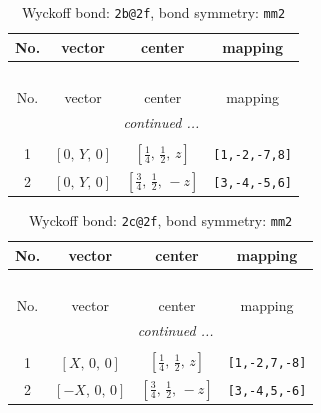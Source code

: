 \documentclass[fleqn,8pt]{jsarticle}
\begin{document}
\renewcommand{\arraystretch}{1.2}
\begin{longtable}{cccc}
\caption{Wyckoff bond: {\tt 2b@2f}, bond symmetry: {\tt mm2}}
 \\
 \hline \hline
No. & vector & center & mapping \\ \hline \endfirsthead

\multicolumn{3}{l}{\tablename\ \thetable{}} \\
 \hline \hline
No. & vector & center & mapping \\ \hline \endhead

 \hline \hline
\multicolumn{3}{r}{\footnotesize\it continued ...} \\ \endfoot

 \hline \hline
\multicolumn{3}{r}{} \\ \endlastfoot

1 & $\left[ 0,\, Y,\, 0 \right]$ & $\left[ \frac{1}{4},\, \frac{1}{2},\, z \right]$ & {\tt [1,-2,-7,8]} \\ \hline
2 & $\left[ 0,\, Y,\, 0 \right]$ & $\left[ \frac{3}{4},\, \frac{1}{2},\, - z \right]$ & {\tt [3,-4,-5,6]} \\
\end{longtable}
\renewcommand{\arraystretch}{1.2}
\begin{longtable}{cccc}
\caption{Wyckoff bond: {\tt 2c@2f}, bond symmetry: {\tt mm2}}
 \\
 \hline \hline
No. & vector & center & mapping \\ \hline \endfirsthead

\multicolumn{3}{l}{\tablename\ \thetable{}} \\
 \hline \hline
No. & vector & center & mapping \\ \hline \endhead

 \hline \hline
\multicolumn{3}{r}{\footnotesize\it continued ...} \\ \endfoot

 \hline \hline
\multicolumn{3}{r}{} \\ \endlastfoot

1 & $\left[ X,\, 0,\, 0 \right]$ & $\left[ \frac{1}{4},\, \frac{1}{2},\, z \right]$ & {\tt [1,-2,7,-8]} \\ \hline
2 & $\left[ - X,\, 0,\, 0 \right]$ & $\left[ \frac{3}{4},\, \frac{1}{2},\, - z \right]$ & {\tt [3,-4,5,-6]} \\
\end{longtable}
\renewcommand{\arraystretch}{1.2}
\end{document}
